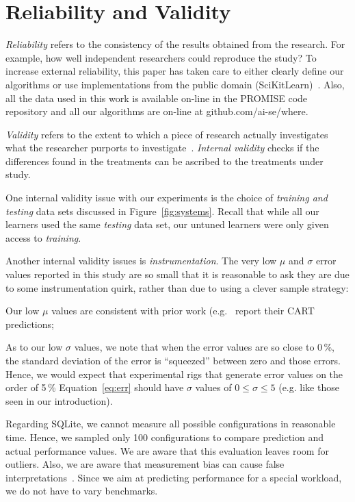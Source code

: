 \documentclass{sig-alternative}
\newcommand{\fig}[1]{Figure~\ref{fig:#1}}
\newcommand{\eq}[1]{Equation~\ref{eq:#1}}
\begin{document}
\section{Reliability and Validity}\label{sect:construct}

{\em Reliability} refers to the consistency of the results obtained
from the research.  For example,   how well independent researchers
could reproduce the study? To increase external
reliability, this paper has taken care to either  clearly define our
algorithms or use implementations from the public domain
(SciKitLearn)~\cite{scikit-learn}. Also, all the data used in this work is available
on-line in the PROMISE code repository and all our algorithms
are on-line at github.com/ai-se/where.

{\em Validity} refers to the extent to which a piece of research actually
investigates what the researcher purports to investigate~\cite{SSA15}.
{\em Internal validity} checks if the differences found in
the treatments can be ascribed to the treatments under study. 

One internal validity issue with our experiments is the choice
of {\em training and testing} data sets discussed in 
\fig{systems}. Recall that while all our learners used the same
{\em testing} data set, our untuned learners were only given
access to {\em training}.

Another internal validity issues is {\em instrumentation}. The very low $\mu$ and $\sigma$ error values
reported in this study are so small that it is reasonable to ask they are due to some instrumentation
quirk, rather than due to using a clever sample strategy:
\begin{compactitem}
\item
Our low $\mu$ values are consistent with prior work (e.g.~\cite{sarkar2015cost} report their CART predictions;
\item
As to our low $\sigma$ values, we note that when the  error values are so close to 0\,\%, the standard
deviation of the error is ``squeezed'' between zero and those errors. Hence, we would expect that
experimental rigs
that generate error values on the order of 5\,\% \eq{err} should have $\sigma$ values of $0\le \sigma \le 5$ (e.g. like those seen in our introduction).
\end{compactitem}

Regarding SQLite, we cannot measure all possible configurations in reasonable time. Hence, we sampled only 100 configurations to compare prediction and actual performance values. We are aware that this evaluation leaves room for outliers.
Also, we are aware that measurement bias can cause false interpretations~\cite{me12d}. Since we aim at predicting performance for a special workload, we do not have to vary benchmarks.
\end{document}
